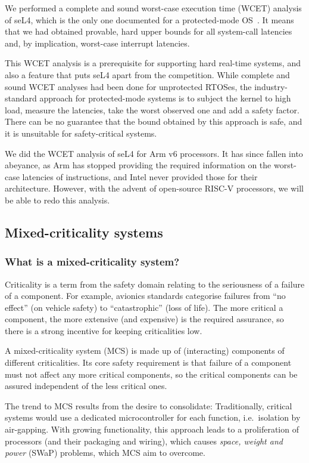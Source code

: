\documentclass[english,a4paper,12pt\ifDraft,draft\fi]{report}
\newcommand{\SSect}[1]{\subsection{#1}}
\newcommand{\SSSect}[1]{\subsubsection*{#1}}
\newcommand{\SSect}[1]{\section{#1}}
\newcommand{\SSSect}[1]{\subsection*{#1}}
\begin{document}
  We performed a complete and sound worst-case execution time (WCET)
  analysis of seL4, which is the only one documented for a protected-mode
  OS~\citep{Blackham_SCRH_11, Sewell_KH_16}. It means that we had
  obtained provable, hard upper bounds for all system-call latencies
  and, by implication, worst-case interrupt latencies.

  This WCET analysis is a prerequisite for supporting hard real-time
  systems, and also a feature that puts seL4 apart from the
  competition. While complete and sound WCET analyses had been done
  for unprotected RTOSes, the industry-standard approach for
  protected-mode systems is to subject the kernel to high load,
  measure the latencies, take the worst observed one and add a safety
  factor. There can be no guarantee that the bound obtained by this
  approach is safe, and it is unsuitable for safety-critical systems.

  We did the WCET analysis of seL4 for Arm v6 processors. It has since
  fallen into abeyance, as Arm has stopped providing the required
  information on the worst-case latencies of instructions, and Intel
  never provided those for their architecture. However, with the
  advent of open-source RISC-V processors, we will be able to redo
  this analysis.

  \SSect{Mixed-criticality systems}\label{s:mcs}

  \SSSect{What is a mixed-criticality system?}

  Criticality is a term from the safety domain relating to the
  seriousness of a failure of a component. For example, avionics
  standards categorise failures from ``no effect'' (on vehicle safety)
  to ``catastrophic'' (loss of life). The more critical a component,
  the more extensive (and expensive) is the required assurance, so
  there is a strong incentive for keeping criticalities low.

  A mixed-criticality system (MCS) is made up of (interacting)
  components of different criticalities. Its core safety requirement
  is that failure of a component must not affect any more critical
  components, so the critical components can be assured independent of
  the less critical ones.

  The trend to MCS results from the desire to consolidate:
  Traditionally, critical systems would use a dedicated
  microcontroller for each function, i.e.\ isolation by air-gapping.
  With growing functionality, this approach leads to a proliferation
  of processors (and their packaging and wiring), which causes \emph{space,
  weight and power} (SWaP) problems, which MCS aim to overcome.
\end{document}
